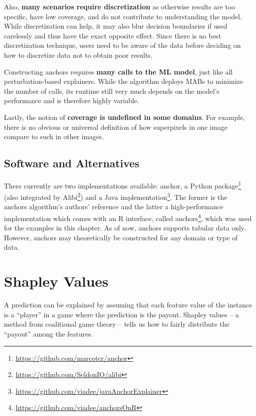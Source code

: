 \documentclass[
  12pt,
]{krantz}
\renewcommand{\href}[2]{#2\footnote{\url{#1}}}
\begin{document}
Also, \textbf{many scenarios require discretization} as otherwise results are too specific, have low coverage, and do not contribute to understanding the model. While discretization can help, it may also blur decision boundaries if used carelessly and thus have the exact opposite effect. Since there is no best discretization technique, users need to be aware of the data before deciding on how to discretize data not to obtain poor results.

Constructing anchors requires \textbf{many calls to the ML model}, just like all perturbation-based explainers. While the algorithm deploys MABs to minimize the number of calls, its runtime still very much depends on the model's performance and is therefore highly variable.

Lastly, the notion of \textbf{coverage is undefined in some domains}. For example, there is no obvious or universal definition of how superpixels in one image compare to such in other images.

\hypertarget{software-and-alternatives-4}{%
\subsection{Software and Alternatives}\label{software-and-alternatives-4}}

There currently are two implementations available: \href{https://github.com/marcotcr/anchor}{anchor, a Python package} (also integrated by \href{https://github.com/SeldonIO/alibi}{Alibi}) and a \href{https://github.com/viadee/javaAnchorExplainer}{Java implementation}.
The former is the anchors algorithm's authors' reference and the latter a high-performance implementation which comes with an R interface, called \href{https://github.com/viadee/anchorsOnR}{anchors}, which was used for the examples in this chapter.
As of now, anchors supports tabular data only. However, anchors may theoretically be constructed for any domain or type of data.

\newpage

\hypertarget{shapley}{%
\section{Shapley Values}\label{shapley}}

A prediction can be explained by assuming that each feature value of the instance is a ``player'' in a game where the prediction is the payout.
Shapley values -- a method from coalitional game theory -- tells us how to fairly distribute the ``payout'' among the features.
\end{document}
